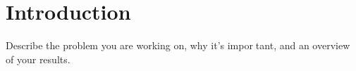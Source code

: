 \section{Introduction}
Describe the problem you are working on, why it’s important, and an overview of your results.